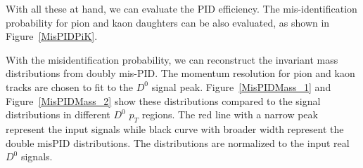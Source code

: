 With all these at hand, we can evaluate the PID efficiency. The mis-identification probability for pion and kaon daughters can be also evaluated, as shown in Figure~\ref{MisPIDPiK}. 

\begin{figure}
\end{figure}

With the misidentification probability, we can reconstruct the invariant mass distributions from doubly mis-PID. The momentum resolution for pion and kaon tracks are chosen to fit to the $D^{0}$ signal peak. Figure~\ref{MisPIDMass_1} and Figure~\ref{MisPIDMass_2} show these distributions compared to the signal distributions in different $D^0$ $p_{T}$ regions. The red line with a narrow peak represent the input signals while black curve with broader width represent the double misPID distributions. The distributions are normalized to the input real $D^{0}$ signals.

\begin{figure}
\end{figure}

